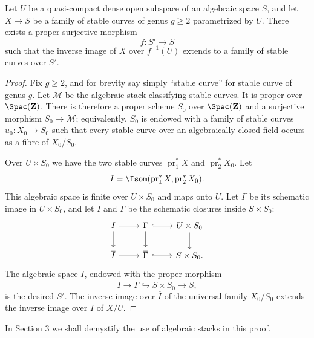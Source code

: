 \begin{lemma}\label{lem:stablecurves}
Let $U$ be a quasi-compact dense open subspace of an algebraic space $S$, and let $X\to S$ be a family of stable curves of genus $g\ge2$ parametrized by $U$. There exists a proper surjective morphism
\[
  f:S'\longrightarrow S
\]
such that the inverse image of $X$ over $f^{-1}(U)$ extends to a family of stable curves over $S'$.
\end{lemma}

\begin{proof}
Fix $g\ge2$, and for brevity say simply ``stable curve'' for stable curve of genus $g$. Let $\mathcal M$ be the algebraic stack classifying stable curves. It is proper over $\Spec(\mathbf Z)$. There is therefore a proper scheme $S_0$ over $\Spec(\mathbf Z)$ and a surjective morphism $S_0\to\mathcal M$; equivalently, $S_0$ is endowed with a family of stable curves $u_0:X_0\to S_0$ such that every stable curve over an algebraically closed field occurs as a fibre of $X_0/S_0$.

Over $U\times S_0$ we have the two stable curves $\operatorname{pr}_1^*X$ and $\operatorname{pr}_2^*X_0$. Let
\[
  I=\Isom(\operatorname{pr}_1^*X,\operatorname{pr}_2^*X_0).
\]
This algebraic space is finite over $U\times S_0$ and maps onto $U$. Let $\Gamma$ be its schematic image in $U\times S_0$, and let $\overline I$ and $\overline\Gamma$ be the schematic closures inside $S\times S_0$:
\[
\begin{tikzcd}
I \arrow[r] \arrow[d] & \Gamma \arrow[r,hook] \arrow[d] & U\times S_0 \arrow[d]\\
\overline I \arrow[r] & \overline\Gamma \arrow[r,hook] & S\times S_0 .
\end{tikzcd}
\]
The algebraic space $\overline I$, endowed with the proper morphism
\[
  \overline I\longrightarrow \overline\Gamma\hookrightarrow S\times S_0\longrightarrow S,
\]
is the desired $S'$. The inverse image over $\overline I$ of the universal family $X_0/S_0$ extends the inverse image over $I$ of $X/U$.
\end{proof}

In Section 3 we shall demystify the use of algebraic stacks in this proof.

